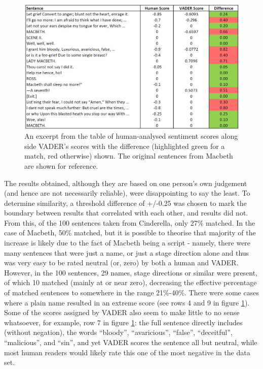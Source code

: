 \documentclass{article}
\begin{document}
        \begin{figure}[hbt]
            \includegraphics[width=1\textwidth]{Figures/HandAnalysis/Macbeth}
            \centering
            \caption{An excerpt from the table of human-analysed sentiment scores along side VADER's scores with the difference (highlighted green for a match, red otherwise) shown. The original sentences from Macbeth are shown for reference.}
            \label{fig:handMacbeth}
        \end{figure}
        
        The results obtained, although they are based on one person's own judgement (and hence are not necessarily reliable), were disappointing to say the least. To determine similarity, a threshold difference of +/-0.25 was chosen to mark the boundary between results that correlated with each other, and results did not. From this, of the 100 sentences taken from Cinderella, only 27\% matched. In the case of Macbeth, 50\% matched, but it is possible to theorise that majority of the increase is likely due to the fact of Macbeth being a script - namely, there were many sentences that were just a name, or just a stage direction alone and thus was very easy to be rated neutral (or, zero) by both a human and VADER. However, in the 100 sentences, 29 names, stage directions or similar were present, of which 10 matched (mainly at or near zero), decreasing the effective percentage of matched sentences to somewhere in the range 21\%-40\%. There were some cases where a plain name resulted in an extreme score (see rows 4 and 9 in figure \ref{fig:handMacbeth}). Some of the scores assigned by VADER also seem to make little to no sense whatsoever, for example, row 7 in figure \ref{fig:handMacbeth}: the full sentence directly includes (without negation), the words ``bloody'', ``avaricious'', ``false'', ``deceitful'', ``malicious'', and ``sin'', and yet VADER scores the sentence all but neutral, while most human readers would likely rate this one of the most negative in the data set.
\end{document}
